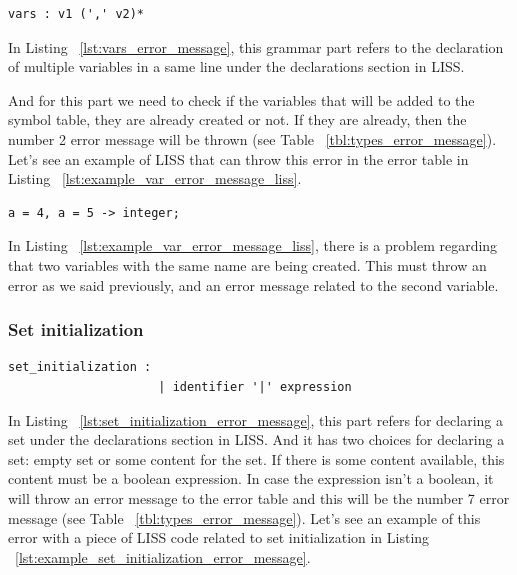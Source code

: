 \documentclass[
  oneside,
  11pt, a4paper,
  footinclude=true,
  headinclude=true,
  cleardoublepage=empty
]{scrbook}
\begin{document}
\begin{lstlisting}[label={lst:vars_error_message},caption={Vars rule in LISS}]
  vars : v1 (',' v2)*
\end{lstlisting}

In Listing ~\ref{lst:vars_error_message}, this grammar part refers to the declaration of multiple variables in a same line under the declarations section in LISS.

And for this part we need to check if the variables that will be added to the symbol table, they are already created or not. If they are already, then the number 2 error message will be thrown (see Table ~\ref{tbl:types_error_message}).
Let's see an example of LISS that can throw this error in the error table in Listing ~\ref{lst:example_var_error_message_liss}.

\begin{lstlisting}[label={lst:example_var_error_message_liss},caption={Example of an error message in LISS for vars non-terminal}]
  a = 4, a = 5 -> integer;
\end{lstlisting}

In Listing ~\ref{lst:example_var_error_message_liss}, there is a problem regarding that two variables with the same name are being created. This must throw an error as we said previously, and an error message related to the second variable.

\subsubsection{Set initialization}

\begin{lstlisting}[label={lst:set_initialization_error_message},caption={Set initialization rule in LISS}]
  set_initialization :                    
                     | identifier '|' expression
\end{lstlisting}

In Listing ~\ref{lst:set_initialization_error_message}, this part refers for declaring a set under the declarations section in LISS.
And it has two choices for declaring a set: empty set or some content for the set.
If there is some content available, this content must be a boolean expression. In case the expression isn't a boolean, it will throw an error message to the error table and this will be the number 7 error message (see Table ~\ref{tbl:types_error_message}).
Let's see an example of  this error with a piece of LISS code related to set initialization in Listing ~\ref{lst:example_set_initialization_error_message}.
\end{document}
